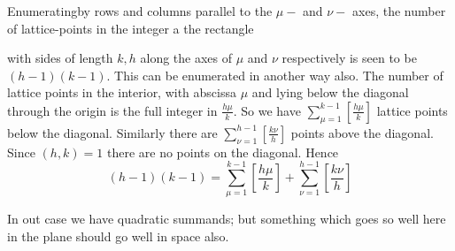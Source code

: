 Enumerating\pageoriginale by rows and columns parallel  to the $\mu-$
and $\nu-$ axes, the number of lattice-points in the integer a the
rectangle 
\begin{figure}[H]
\end{figure}

\noindent with sides of length $k, h$ along the axes of $\mu$ and
$\nu$ respectively is seen to be $(h-1)(k-1)$. This can be enumerated
in another way also. The number of lattice points in the interior,
with abscissa $\mu$ and lying below the diagonal through the origin is
the full integer in $\frac{h \mu}{k}$. So we have $\sum\limits^{k-1}_{\mu=1}
\left[ \frac{h \mu}{k}\right]$ lattice points below the
diagonal. Similarly there are $\sum\limits^{h-1}_{\nu =1} \left[\frac{k
    \nu}{h} \right]$ points above the diagonal. Since $(h, k)=1$ there
are no points on the diagonal. Hence
$$
(h-1)(k-1) = \sum^{k-1}_{\mu=1} \left[ \frac{h \mu}{k}\right] +
\sum^{h-1}_{\nu=1} \left[ \frac{k \nu}{h}\right]
$$

In out case we have quadratic summands; but something which goes so
well here in the plane should go well in space also.

